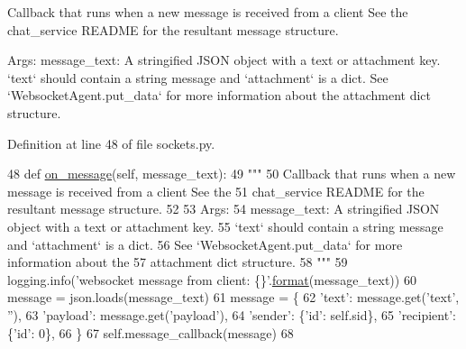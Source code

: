 \begin{DoxyVerb}Callback that runs when a new message is received from a client See the
chat_service README for the resultant message structure.

Args:
    message_text: A stringified JSON object with a text or attachment key.
`text` should contain a string message and `attachment` is a dict.
See `WebsocketAgent.put_data` for more information about the
attachment dict structure.
\end{DoxyVerb}
 

Definition at line 48 of file sockets.\+py.


\begin{DoxyCode}
48     \textcolor{keyword}{def }\hyperlink{namespaceparlai_1_1chat__service_1_1services_1_1browser__chat_1_1client_a01c1536b48e2f5badd2fe58ea02b9a5c}{on\_message}(self, message\_text):
49         \textcolor{stringliteral}{"""}
50 \textcolor{stringliteral}{        Callback that runs when a new message is received from a client See the}
51 \textcolor{stringliteral}{        chat\_service README for the resultant message structure.}
52 \textcolor{stringliteral}{}
53 \textcolor{stringliteral}{        Args:}
54 \textcolor{stringliteral}{            message\_text: A stringified JSON object with a text or attachment key.}
55 \textcolor{stringliteral}{                `text` should contain a string message and `attachment` is a dict.}
56 \textcolor{stringliteral}{                See `WebsocketAgent.put\_data` for more information about the}
57 \textcolor{stringliteral}{                attachment dict structure.}
58 \textcolor{stringliteral}{        """}
59         logging.info(\textcolor{stringliteral}{'websocket message from client: \{\}'}.\hyperlink{namespaceparlai_1_1chat__service_1_1services_1_1messenger_1_1shared__utils_a32e2e2022b824fbaf80c747160b52a76}{format}(message\_text))
60         message = json.loads(message\_text)
61         message = \{
62             \textcolor{stringliteral}{'text'}: message.get(\textcolor{stringliteral}{'text'}, \textcolor{stringliteral}{''}),
63             \textcolor{stringliteral}{'payload'}: message.get(\textcolor{stringliteral}{'payload'}),
64             \textcolor{stringliteral}{'sender'}: \{\textcolor{stringliteral}{'id'}: self.sid\},
65             \textcolor{stringliteral}{'recipient'}: \{\textcolor{stringliteral}{'id'}: 0\},
66         \}
67         self.message\_callback(message)
68 
\end{DoxyCode}
\mbox{\label{classparlai_1_1chat__service_1_1services_1_1websocket_1_1sockets_1_1MessageSocketHandler_a3b5c9e9fc500c312e1895c6220d52ca7}} 
